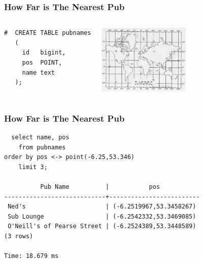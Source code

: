 \documentclass{beamer}
\begin{document}
\begin{frame}[fragile]
  \frametitle{How Far is The Nearest Pub}

  \vfill

\begin{columns}[c]

\begin{verbatim}
#  CREATE TABLE pubnames
   (
     id   bigint,
     pos  POINT,
     name text
   );
\end{verbatim}  

\begin{center}
  \includegraphics[height=9em]{ltlng.jpg}
\end{center}
\end{columns}
\end{frame}

\begin{frame}[fragile]
  \frametitle{How Far is The Nearest Pub}

\begin{verbatim}
  select name, pos
    from pubnames
order by pos <-> point(-6.25,53.346)
    limit 3;

          Pub Name          |           pos           
----------------------------+-------------------------
 Ned's                      | (-6.2519967,53.3458267)
 Sub Lounge                 | (-6.2542332,53.3469085)
 O'Neill's of Pearse Street | (-6.2524389,53.3448589)
(3 rows)

Time: 18.679 ms
\end{verbatim}  
\end{frame}
\end{document}
